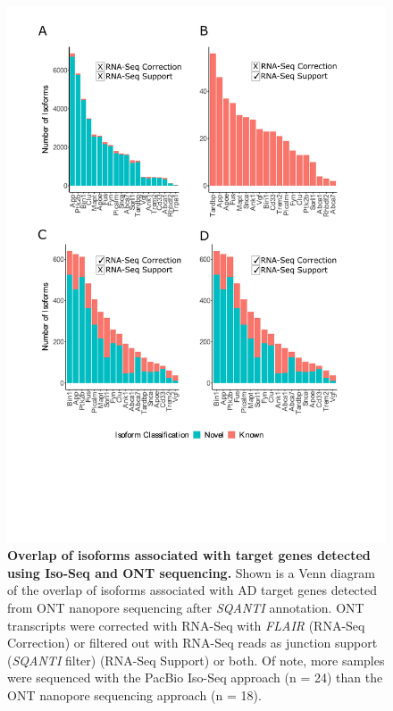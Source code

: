 \begin{figure}[!htp]
	\centering
	\includegraphics[page=2,trim={0cm 20cm 0cm 0cm},clip,scale = 0.55]{Figures/ONTTargetedTranscriptome_BioinformaticsPipeline}
	\captionsetup{width=0.95\textwidth,singlelinecheck=off}
	\caption[Overlap of isoforms associated with target genes detected using Iso-Seq and ONT sequencing]%
	{\textbf{Overlap of isoforms associated with target genes detected using Iso-Seq and ONT sequencing.} Shown is a Venn diagram of the overlap of isoforms associated with AD target genes detected from ONT nanopore sequencing after \textit{SQANTI} annotation. ONT transcripts were corrected with RNA-Seq with \textit{FLAIR} (RNA-Seq Correction) or filtered out with RNA-Seq reads as junction support (\textit{SQANTI} filter) (RNA-Seq Support) or both. Of note, more samples were sequenced with the PacBio Iso-Seq approach (n = 24) than the ONT nanopore sequencing approach (n = 18).   
	}
	\label{fig:ONT_isoseq_comparisons}
\end{figure}

